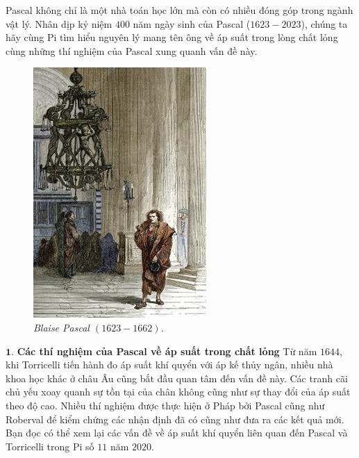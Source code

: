 \begin{multicols}{2}
	Pascal không chỉ là một nhà toán học lớn mà còn có nhiều đóng góp trong ngành vật lý. Nhân dịp kỷ niệm $400$ năm ngày sinh của Pascal ($1623-2023$), chúng ta hãy cùng Pi tìm hiểu nguyên lý mang tên ông về áp suất trong lòng chất lỏng cùng những thí nghiệm của Pascal xung quanh vấn đề này.
	\begin{figure}[H]
		\vspace*{-5pt}
		\centering
		\captionsetup{labelformat= empty, justification=centering}
		\includegraphics[width= 0.7\linewidth]{1}
		\caption{\small\textit{\color{timhieukhoahoc}Blaise Pascal $(1623-1662)$.}}
		\vspace*{-10pt}
	\end{figure}
	$\pmb{1.}$ \textbf{Các thí nghiệm của Pascal về áp suất trong chất lỏng}
	\vskip 0.1cm
	Từ năm $1644$, khi Torricelli tiến hành đo áp suất khí quyển với áp kế thủy ngân, nhiều nhà khoa học khác ở châu Âu cũng bắt đầu quan tâm đến vấn đề này. Các tranh cãi chủ yếu xoay quanh sự tồn tại của chân không cũng như sự thay đổi của áp suất theo độ cao. Nhiều thí nghiệm được thực hiện ở Pháp bởi Pascal cũng như Roberval để kiểm chứng các nhận định đã có cũng như đưa ra các kết quả mới. Bạn đọc có thể xem lại các vấn đề về áp suất khí quyển liên quan đến Pascal và Torricelli trong Pi số $11$ năm $2020$.

\end{multicols}
